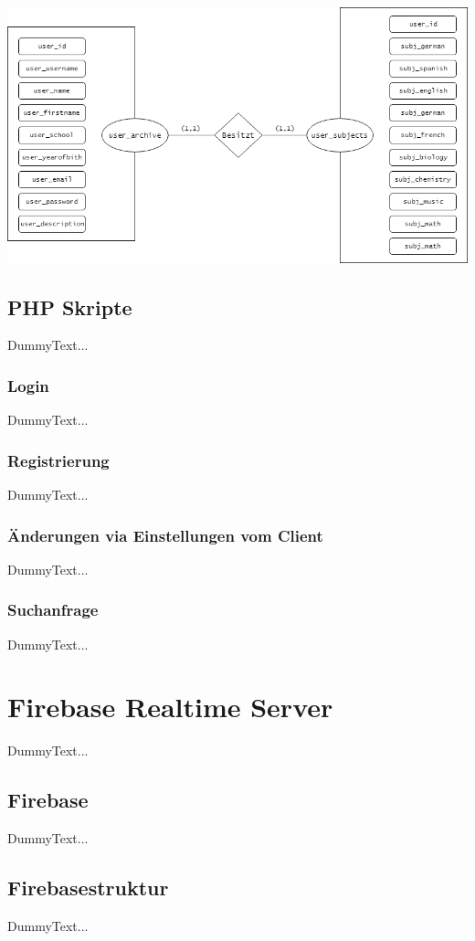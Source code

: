 \documentclass[a4paper,11pt]{report}
\begin{document}
				\includegraphics[scale=0.5]{ERM-Matura}
				
				\subsection{PHP Skripte} \label{ssec:PHP}
				DummyText...
					\subsubsection{Login}
					DummyText...
					\subsubsection{Registrierung}
					DummyText...
					\subsubsection{Änderungen via Einstellungen vom Client}
					DummyText...
					\subsubsection{Suchanfrage} \label{sssec:Suchanfrage}
					DummyText...
					
			\section{Firebase Realtime Server}
			DummyText...
				\subsection{Firebase}
				DummyText...
				\subsection{Firebasestruktur}
				DummyText...
		
\end{document}

